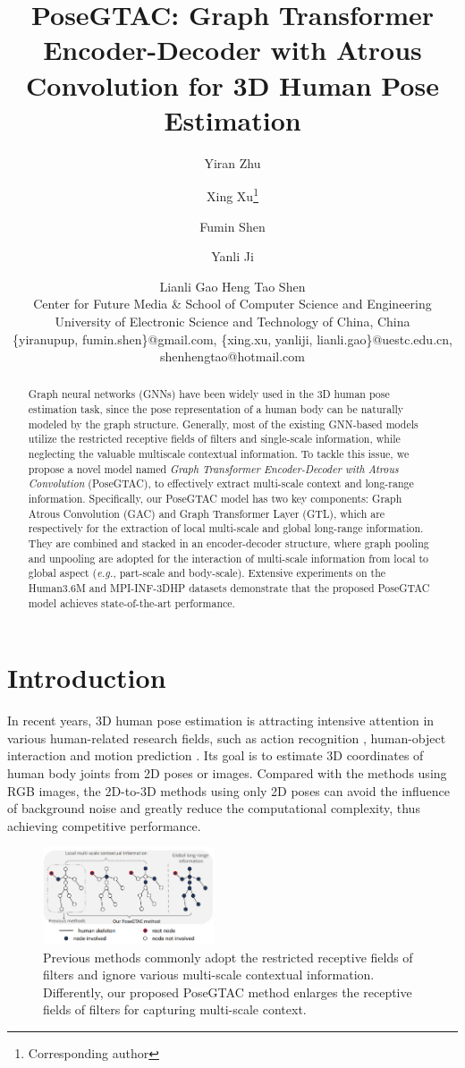 \documentclass{article}
\title{PoseGTAC: Graph Transformer Encoder-Decoder with Atrous Convolution for 3D Human Pose Estimation}
\author{
Yiran Zhu\and
Xing Xu\footnote{Corresponding author}\and
Fumin Shen\and
Yanli Ji\and
Lianli Gao\And
Heng Tao Shen\\
\affiliations
Center for Future Media & School of Computer Science and Engineering\\
University of Electronic Science and Technology of China, China\\
\emails
\{yiranupup, fumin.shen\}@gmail.com,
\{xing.xu, yanliji, lianli.gao\}@uestc.edu.cn, shenhengtao@hotmail.com
}
\begin{document}
\maketitle
\begin{abstract}
Graph neural networks (GNNs) have been widely used in the 3D human pose estimation task, since the pose representation of a human body can be naturally modeled by the graph structure. Generally, most of the existing GNN-based models utilize the restricted receptive fields of filters and single-scale information, while neglecting the valuable multiscale contextual information. To tackle this issue, we propose a novel model named \textit{Graph Transformer Encoder-Decoder with Atrous Convolution} (PoseGTAC), to effectively extract multi-scale context and long-range information. Specifically, our PoseGTAC model has two key components: Graph Atrous Convolution (GAC) and Graph Transformer Layer (GTL), which are respectively for the extraction of local multi-scale and global long-range information. They are combined and stacked in an encoder-decoder structure, where graph pooling and unpooling are adopted for the interaction of multi-scale information from local to global aspect (\textit{e.g.}, part-scale and body-scale). Extensive experiments on the Human3.6M and MPI-INF-3DHP datasets demonstrate that the proposed PoseGTAC model achieves state-of-the-art performance.
\end{abstract}

\section{Introduction}

In recent years, 3D human pose estimation is attracting intensive attention in various human-related research fields, such as action recognition \cite{Yan et al., 2018, Ji et al., 2019}, human-object interaction \cite{Li et al., 2020} and motion prediction \cite{Mao et al., 2019}. Its goal is to estimate 3D coordinates of human body joints from 2D poses or images. Compared with the methods \cite{Zhou et al., 2017, Wu and Xiao, 2020} using RGB images, the 2D-to-3D methods \cite{Zhao et al., 2019, Liu et al., 2020} using only 2D poses can avoid the influence of background noise and greatly reduce the computational complexity, thus achieving competitive performance.

\begin{figure}
    \centering
    \includegraphics[width=0.45\textwidth]{figures/Fig1.png}
    \caption{Previous methods commonly adopt the restricted receptive fields of filters and ignore various multi-scale contextual information. Differently, our proposed PoseGTAC method enlarges the receptive fields of filters for capturing multi-scale context.}
\end{figure}
\end{document}
